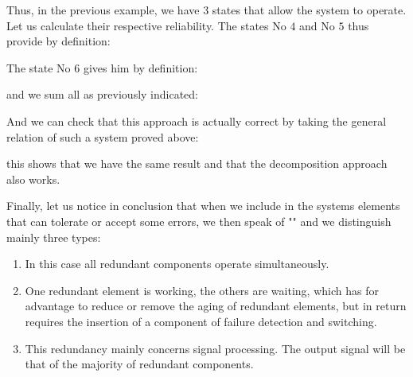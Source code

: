 	Thus, in the previous example, we have $3$ states that allow the system to operate. Let us calculate their respective reliability. The states No $4$ and No $5$ thus provide by definition:
	
	The state No $6$ gives him by definition:
	
	and we sum all as previously indicated:
	
	And we can check that this approach is actually correct by taking the general relation of such a system proved above:
	
	this shows that we have the same result and that the decomposition approach also works.
	
	Finally, let us notice in conclusion that when we include in the systems elements that can tolerate or accept some errors, we then speak of "" and we distinguish mainly three types:
	\begin{enumerate}
		\item {} In this case all redundant components operate simultaneously.
		
		\item {} One redundant element is working, the others are waiting, which has for advantage to reduce or remove the aging of redundant elements, but in return requires the insertion of a component of failure detection and switching.
		
		\item {} This redundancy mainly concerns signal processing. The output signal will be that of the majority of redundant components.
	\end{enumerate}
		
	\pagebreak
